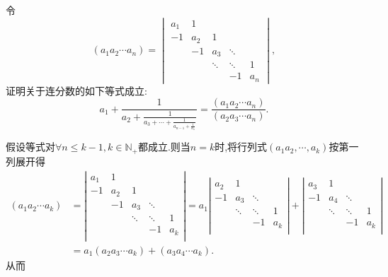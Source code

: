 \documentclass[lang=cn,newtx,10pt,scheme=chinese]{elegantbook}
\begin{document}
\begin{exercise}
    令
    \[
    \left( a_{1} a_{2} \cdots a_{n} \right) = 
    \begin{vmatrix}
    a_{1} & 1 &   &   &   \\
    -1 & a_{2} & 1 &   &   \\
      & -1 & a_{3} & \ddots &   \\
      &   & \ddots & \ddots & 1 \\
      &   &   & -1 & a_{n}
    \end{vmatrix},
    \]
    证明关于连分数的如下等式成立:
    \[
    a_{1} + \frac{1}{a_{2} + \frac{1}{a_{3} + \cdots + \frac{1}{a_{n - 1} + \frac{1}{a_{n}}}}} = \frac{\left( a_{1} a_{2} \cdots a_{n} \right)}{\left( a_{2} a_{3} \cdots a_{n} \right)}.
    \]
\end{exercise}
\begin{solution}
假设等式对$\forall n\leq k-1,k\in \mathbb{N}_+$都成立.则当$n=k$时,将行列式$(a_1a_2,\cdots,a_k)$按第一列展开得
\begin{align*}
    \left( a_1a_2\cdots a_k \right) &=\left| \begin{matrix}
        a_1&		1&		&		&		\\
        -1&		a_2&		1&		&		\\
        &		-1&		a_3&		\ddots&		\\
        &		&		\ddots&		\ddots&		1\\
        &		&		&		-1&		a_k\\
    \end{matrix} \right|=a_1\left| \begin{matrix}
        a_2&		1&		&		\\
        -1&		a_3&		\ddots&		\\
        &		\ddots&		\ddots&		1\\
        &		&		-1&		a_k\\
    \end{matrix} \right|+\left| \begin{matrix}
        a_3&		1&		&		\\
        -1&		a_4&		\ddots&		\\
        &		\ddots&		\ddots&		1\\
        &		&		-1&		a_k\\
    \end{matrix} \right|
    \\
    &=a_1\left( a_2a_3\cdots a_k \right) +\left( a_3a_4\cdots a_k \right).
\end{align*}
从而
\begin{align*}

\end{align*}
\end{solution}
\end{document}
